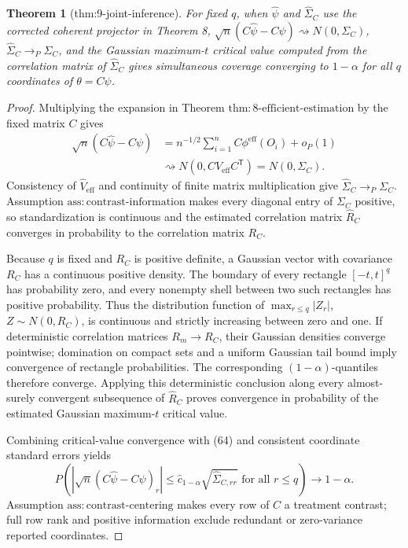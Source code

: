 \documentclass{article}
\newtheorem{theorem}{Theorem}
\begin{document}
\begin{theorem}[thm:9-joint-inference]\label{thm:9-joint-inference}
For fixed \(q\), when \(\widehat\psi\) and \(\widehat\Sigma_C\) use the corrected coherent projector in Theorem 8, \(\sqrt n(C\widehat\psi-C\psi)\rightsquigarrow N(0,\Sigma_C)\), \(\widehat\Sigma_C\to_P\Sigma_C\), and the Gaussian maximum-\(t\) critical value computed from the correlation matrix of \(\widehat\Sigma_C\) gives simultaneous coverage converging to \(1-\alpha\) for all \(q\) coordinates of \(\theta=C\psi\).
\end{theorem}
\begin{proof}
Multiplying the expansion in Theorem \(\mathrm{thm{:}8\mbox{-}efficient\mbox{-}estimation}\) by the fixed matrix \(C\) gives
\[
\begin{aligned}
 \sqrt n(C\widehat\psi-C\psi)
 &=n^{-1/2}\sum_{i=1}^nC\phi^{\mathrm{eff}}(O_i)+o_P(1)\\
 &\rightsquigarrow N(0,CV_{\mathrm{eff}}C^{\mathsf T})
 =N(0,\Sigma_C). \tag{64}
\end{aligned}
\]
Consistency of \(\widehat V_{\mathrm{eff}}\) and continuity of finite matrix multiplication give
\(\widehat\Sigma_C\to_P\Sigma_C\).  Assumption \(\mathrm{ass{:}contrast\mbox{-}information}\) makes every diagonal entry of \(\Sigma_C\) positive, so standardization is continuous and the estimated correlation matrix \(\widehat R_C\) converges in probability to the correlation matrix \(R_C\).

Because \(q\) is fixed and \(R_C\) is positive definite, a Gaussian vector with covariance \(R_C\) has a continuous positive density.  The boundary of every rectangle \([-t,t]^q\) has probability zero, and every nonempty shell between two such rectangles has positive probability.  Thus the distribution function of \(\max_{r\leq q}|Z_r|\), \(Z\sim N(0,R_C)\), is continuous and strictly increasing between zero and one.  If deterministic correlation matrices \(R_m\to R_C\), their Gaussian densities converge pointwise; domination on compact sets and a uniform Gaussian tail bound imply convergence of rectangle probabilities.  The corresponding \((1-\alpha)\)-quantiles therefore converge.  Applying this deterministic conclusion along every almost-surely convergent subsequence of \(\widehat R_C\) proves convergence in probability of the estimated Gaussian maximum-\(t\) critical value.

Combining critical-value convergence with (64) and consistent coordinate standard errors yields
\[
 P\!\left(
 |\sqrt n(C\widehat\psi-C\psi)_r|
 \leq\widehat c_{1-\alpha}\sqrt{\widehat\Sigma_{C,rr}}
 \text{ for all }r\leq q\right)\longrightarrow1-\alpha. \tag{65}
\]
Assumption \(\mathrm{ass{:}contrast\mbox{-}centering}\) makes every row of \(C\) a treatment contrast; full row rank and positive information exclude redundant or zero-variance reported coordinates.
\end{proof}
\end{document}
